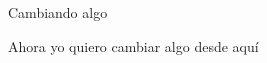 \documentclass{article}
\begin{document}
Cambiando algo

Ahora yo quiero cambiar algo desde aquí
\end{document}
